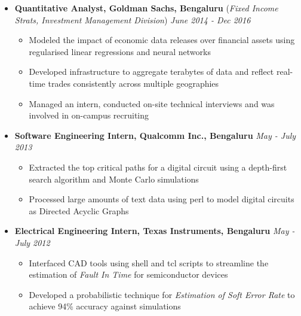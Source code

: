 \documentclass[10pt,a4paper,English]{article}
\newcommand\itemyear[1]{\hfill \emph{\color{itemyear} #1}}
\newcommand\itemenv{\setlength\itemsep{0.5pt} \addtolength{\itemindent}{-5mm}\vspace{-1.5mm}}
\begin{document}
\begin{itemize}
    \item \textbf{Quantitative Analyst, Goldman Sachs, Bengaluru} \hfill (\emph{Fixed Income Strats, Investment Management Division}) \itemyear{June 2014 - Dec 2016}
        \begin{itemize} \itemenv
            \item Modeled the impact of economic data releases over financial assets using regularised linear regressions and neural networks
            \item Developed infrastructure to aggregate terabytes of data and reflect real-time trades consistently across multiple geographies
            \item Managed an intern, conducted on-site technical interviews and was involved in on-campus recruiting
        \end{itemize}

    \item \textbf{Software Engineering Intern, Qualcomm Inc., Bengaluru} \itemyear{May - July 2013}
        \begin{itemize} \itemenv
            \item Extracted the top critical paths for a digital circuit using a depth-first search algorithm and Monte Carlo simulations
            \item Processed large amounts of text data using perl to model digital circuits as Directed Acyclic Graphs
        \end{itemize}

    \item \textbf{Electrical Engineering Intern, Texas Instruments, Bengaluru} \itemyear{May - July 2012}
        \begin{itemize} \itemenv
            \item Interfaced CAD tools using shell and tcl scripts to streamline the estimation of \textit{Fault In Time} for semiconductor devices
            \item Developed a probabilistic technique for \emph{Estimation of Soft Error Rate} to achieve 94\% accuracy against simulations
        \end{itemize}


\end{itemize}
\end{document}
